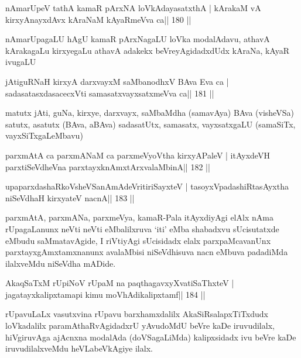 \begin{shl}
nAmarUpeV tathA kamaR pArxNA loVkAdayasatxthA |
kArakaM vA kirxyA\s nayxdAvx kAraNaM kAyaRmeVva ca\hfill || 180 ||
\end{shl}

\begin{artha}
nAmarUpagaLU hAgU kamaR pArxNagaLU loVka modalAdavu, athavA kArakagaLu
kirxyegaLu athavA adakekx beVreyAgidadxdUdx kAraNa, kAyaR ivugaLU
\end{artha}

\begin{shl}
jAtiguRNaH kirxyA darxvayxM saMbanodhxV BAva Eva ca |
sadasatasxdasacecxVti samasatxvayxsatxmeVva ca\hfill || 181 ||
\end{shl}

\begin{artha}
matutx jAti, guNa, kirxye, darxvayx, saMbaMdha (samavAya) BAva
(visheVSa) satutx, asatutx (BAva, aBAva) sadasatUtx, samasatx,
vayxsatxgaLU (samaSiTx, vayxSiTxgaLeMbavu)
\end{artha}

\begin{shl}
parxmAtA ca parxmANaM ca parxmeVyoV\s tha kirxyAPaleV |
itAyxdeVH parxtiSeVdheVna parxtayxknAmxtArxvalaMbinA\hfill || 182 ||
\end{shl}

\begin{shl}
upaparxdashaRkoV\s sheVSanAmAdeVritiriSayxteV |
tasoyxVpadashiRtasAyxtha niSeVdhaH kirxyateV nacnA\hfill || 183 ||
\end{shl}

\begin{artha}
parxmAtA, parxmANa, parxmeVya, kamaR-Pala itAyxdiyAgi elAlx nAma rUpagaLanunx neVti neVti eMbalilxruva `iti' eMba shabadxvu sUcisutatxde eMbudu saMmatavAgide, I riVtiyAgi sUcisidadx elalx parxpaMcavanUnx parxtayxgAmxtamxnanunx avalaMbisi niSeVdhisuva nacn eMbuva padadiMda ilalxveMdu niSeVdha mADide.
\end{artha}


\begin{shl}
AkaqSaTxM rUpiNoV rUpaM na paqthagavxyXvatiSaThxteV |
jagatayxkalipxtamapi kimu moVhAdikalipxtamf\hfill || 184 ||
\end{shl}

\begin{artha}
rUpavuLaLx vasutxvina rUpavu barxhamxdalilx AkaSiRsalapxTiTxdudx loVkadalilx paramAthaRvAgidadxrU yAvudoMdU beVre kaDe iruvudilalx, hiVgiruvAga ajAcnxna modalAda (doVSagaLiMda) kalipxsidadx ivu beVre kaDe iruvudilalxveMdu heVLabeVkAgiye ilalx.
\end{artha}


